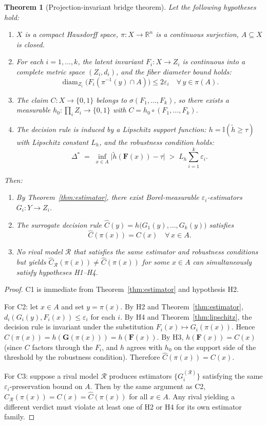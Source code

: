 \documentclass[11pt]{article}
\newtheorem{theorem}{Theorem}
\begin{document}
\begin{theorem}[Projection-invariant bridge theorem]\label{thm:bridge}
Let the following hypotheses hold:
\begin{enumerate}
\item[\textbf{H1.}] $X$ is a compact Hausdorff space, $\pi\colon X\to\mathbb{R}^n$ is a continuous surjection, $A\subseteq X$ is closed.
\item[\textbf{H2.}] For each $i=1,\ldots,k$, the latent invariant $F_i\colon X\to Z_i$ is continuous into a complete metric space $(Z_i,d_i)$, and the fiber diameter bound holds:
\[
\operatorname{diam}_{Z_i}\!\bigl(F_i(\pi^{-1}(y)\cap A)\bigr)\leq 2\varepsilon_i\quad\forall\,y\in\pi(A).
\]
\item[\textbf{H3.}] The claim $C\colon X\to\{0,1\}$ belongs to $\sigma(F_1,\ldots,F_k)$, so there exists a measurable $h_0\colon\prod_i Z_i\to\{0,1\}$ with $C=h_0\circ(F_1,\ldots,F_k)$.
\item[\textbf{H4.}] The decision rule is induced by a Lipschitz support function: $h=\mathbb{I}(\tilde{h}\geq\tau)$ with Lipschitz constant $L_h$, and the robustness condition holds:
\[
\Delta^{*}\;=\;\inf_{x\in A}\bigl|\tilde{h}(\mathbf{F}(x))-\tau\bigr|\;>\;L_h\sum_{i=1}^k\varepsilon_i.
\]
\end{enumerate}

Then:
\begin{enumerate}
\item[\textbf{C1.}] By Theorem~\ref{thm:estimator}, there exist Borel-measurable $\varepsilon_i$-estimators $G_i\colon Y\to Z_i$.
\item[\textbf{C2.}] The surrogate decision rule $\hat{C}(y)=h\bigl(G_1(y),\ldots,G_k(y)\bigr)$ satisfies
\[
\hat{C}(\pi(x))=C(x)\quad\forall\,x\in A.
\]
\item[\textbf{C3.}] No rival model $\mathcal{R}$ that satisfies the same estimator and robustness conditions but yields $\hat{C}_{\mathcal{R}}(\pi(x))\neq\hat{C}(\pi(x))$ for some $x\in A$ can simultaneously satisfy hypotheses H1--H4.
\end{enumerate}
\end{theorem}

\begin{proof}
C1 is immediate from Theorem~\ref{thm:estimator} and hypothesis H2.

For C2: let $x\in A$ and set $y=\pi(x)$. By H2 and Theorem~\ref{thm:estimator}, $d_i(G_i(y),F_i(x))\leq\varepsilon_i$ for each $i$. By H4 and Theorem~\ref{thm:lipschitz}, the decision rule is invariant under the substitution $F_i(x)\mapsto G_i(\pi(x))$. Hence $\hat{C}(\pi(x))=h(\mathbf{G}(\pi(x)))=h(\mathbf{F}(x))$. By H3, $h(\mathbf{F}(x))=C(x)$ (since $C$ factors through the $F_i$, and $h$ agrees with $h_0$ on the support side of the threshold by the robustness condition). Therefore $\hat{C}(\pi(x))=C(x)$.

For C3: suppose a rival model $\mathcal{R}$ produces estimators $\{G_i^{(\mathcal{R})}\}$ satisfying the same $\varepsilon_i$-preservation bound on $A$. Then by the same argument as C2, $\hat{C}_{\mathcal{R}}(\pi(x))=C(x)=\hat{C}(\pi(x))$ for all $x\in A$. Any rival yielding a different verdict must violate at least one of H2 or H4 for its own estimator family.
\end{proof}
\end{document}
